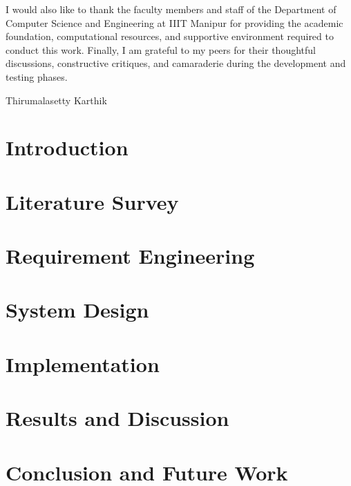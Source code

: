 \documentclass[a4paper, 11pt, oneside]{report}
\begin{document}
I would also like to thank the faculty members and staff of the Department of Computer Science and Engineering at IIIT Manipur for providing the academic foundation, computational resources, and supportive environment required to conduct this work. Finally, I am grateful to my peers for their thoughtful discussions, constructive critiques, and camaraderie during the development and testing phases.

\vspace{1.5cm}

\begin{flushright}
    Thirumalasetty Karthik
\end{flushright}

	\vspace{1cm}
	
	\tableofcontents
	\listoffigures
    \listoftables
	\chapter{Introduction}
	
    \chapter{Literature Survey}
    
    \chapter{Requirement Engineering}
    
    \chapter{System Design}
    
    \chapter{Implementation}
    
    \chapter{Results and Discussion}
    
    \chapter{Conclusion and Future Work}
    
        
    
	
        
\end{document}
